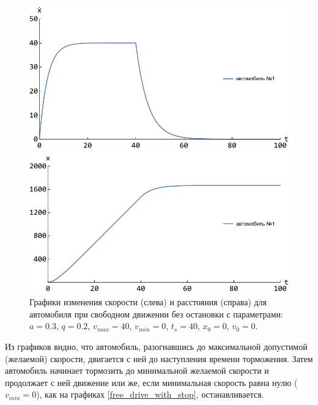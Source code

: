 \documentclass[12pt, a4paper]{extarticle}
\numberwithin{equation}{section}
\begin{document}
\begin{figure}[h!]
	\begin{center}
		\begin{minipage}[h!]{0.48\linewidth}
			\includegraphics[width=1\linewidth,height=0.2\textheight]
			{Images/free_drive_speed_with_stop.pdf}
		\end{minipage}
		\hfill 
		\begin{minipage}[h!]{0.48\linewidth}
			\includegraphics[width=1\linewidth,height=0.2\textheight]
			{Images/free_drive_distance_with_stop.pdf}
		\end{minipage}
		\caption{Графики изменения скорости (слева) и расстояния (справа) для автомобиля при свободном движении без остановки с параметрами: $a=0.3$, $q=0.2$, $v_{max}=40$, $v_{min}=0$, $t_s=40$, $x_0=0$, $v_0=0$.}
		\label{free_drive_with_stop}
	\end{center}
\end{figure}

Из графиков видно, что автомобиль, разогнавшись до максимальной допустимой (желаемой) скорости, двигается с ней до наступления времени торможения. Затем автомобиль начинает тормозить до минимальной желаемой скорости и продолжает с ней движение или же, если минимальная скорость равна нулю ($v_{min}=0$), как на графиках \eqref{free_drive_with_stop}, останавливается.
 
\end{document}
